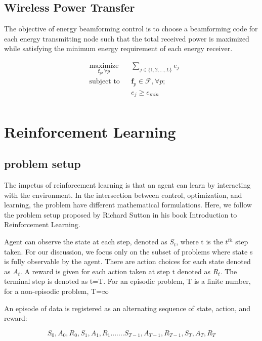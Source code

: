 \subsection{Wireless Power Transfer}

The objective of energy beamforming control is to choose a beamforming code for each energy transmitting node such that the total received power is maximized while satisfying the minimum energy requirement of each energy receiver.

\begin{equation*}
    \begin{aligned}
        & \underset{ \textbf{f}_p, \forall p}{\text{maximize}}
        && \displaystyle\sum_{j \in \{1,2,...,L\}} e_j\\
        & \text{subject to}
        && \textbf{f}_p \in \mathcal{F}, \forall p;\\
        &&& e_j \geq e_{min}\\
    \end{aligned}
\end{equation*}


\section{Reinforcement Learning}


\subsection{problem setup}
The impetus of reinforcement learning is that an agent can learn by interacting with the environment. In the intersection between control, optimization, and learning, the problem have different mathematical formulations. Here, we follow the problem setup proposed by Richard Sutton in his book Introduction to Reinforcement Learning. \cite{10.5555/551283}

Agent can observe the state at each step, denoted as $ S_{t} $, where t is the $t^{th}$ step taken. For our discussion, we focus only on the subset of problems where state s is fully observable by the agent. There are action choices for each state denoted as $ A_{t} $. A reward is given for each action taken at step t denoted as $ R_{t} $. The terminal step is denoted as t=T. For an episodic problem, T is a finite number, for a non-episodic problem, T=$\infty$

An episode of data is registered as an alternating sequence of state, action, and reward:

$$ S_{0}, A_{0}, R_{0}, S_{1}, A_{1}, R_{1}.......S_{T-1},A_{T-1},R_{T-1},S_{T},A_{T},R_{T} $$

